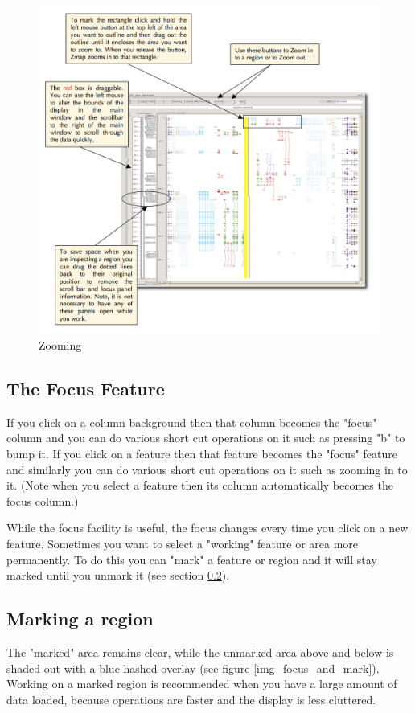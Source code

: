 \documentclass[letterpaper]{article}
\begin{document}
\begin{figure}
\centering
\color[rgb]{0.30980393,0.5058824,0.7411765}
\includegraphics[width=15.231cm]{img_zooming.png}
\caption{Zooming}
\label{img_zooming}
\end{figure}

\subsection{The Focus Feature}
If you click on a column background then that column becomes the "focus" column and you can do various short cut operations on it such as pressing "b" to bump it. If you click on a feature then that feature becomes the "focus" feature and similarly you can do various short cut operations on it such as zooming in to it. (Note when you select a feature then its column automatically becomes the focus column.)

While the focus facility is useful, the focus changes every time you click on a new feature. Sometimes you want to select a "working" feature or area more permanently. To do this you can "mark" a feature or region and it will stay marked until you unmark it (see section \ref{section_marking_a_region}).

\subsection{Marking a region}
\label{section_marking_a_region}
The "marked" area remains clear, while the unmarked area above and below is shaded out with a blue hashed overlay (see figure \ref{img_focus_and_mark}). Working on a marked region is recommended when you have a large amount of data loaded, because operations are faster and the display is less cluttered.
\end{document}
